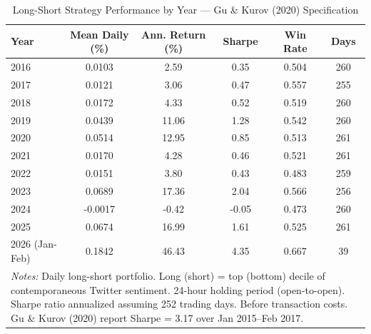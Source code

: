 \begin{table}[htbp]
\centering
\caption{Long-Short Strategy Performance by Year --- Gu \& Kurov (2020) Specification}
\label{tab:gk_ls_annual}
\small
\begin{tabular}{lccccc}
\hline\hline
Year & Mean Daily (\%) & Ann. Return (\%) & Sharpe & Win Rate & Days \\
\hline
  2016 & 0.0103 & 2.59 & 0.35 & 0.504 & 260 \\
  2017 & 0.0121 & 3.06 & 0.47 & 0.557 & 255 \\
  2018 & 0.0172 & 4.33 & 0.52 & 0.519 & 260 \\
  2019 & 0.0439 & 11.06 & 1.28 & 0.542 & 260 \\
  2020 & 0.0514 & 12.95 & 0.85 & 0.513 & 261 \\
  2021 & 0.0170 & 4.28 & 0.46 & 0.521 & 261 \\
  2022 & 0.0151 & 3.80 & 0.43 & 0.483 & 259 \\
  2023 & 0.0689 & 17.36 & 2.04 & 0.566 & 256 \\
  2024 & -0.0017 & -0.42 & -0.05 & 0.473 & 260 \\
  2025 & 0.0674 & 16.99 & 1.61 & 0.525 & 261 \\
  2026 (Jan-Feb) & 0.1842 & 46.43 & 4.35 & 0.667 & 39 \\
\hline\hline
\multicolumn{6}{p{0.95\linewidth}}{\footnotesize \textit{Notes:} Daily long-short portfolio. Long (short) = top (bottom) decile of contemporaneous Twitter sentiment. 24-hour holding period (open-to-open). Sharpe ratio annualized assuming 252 trading days. Before transaction costs. Gu \& Kurov (2020) report Sharpe = 3.17 over Jan 2015--Feb 2017.} \\
\end{tabular}
\end{table}